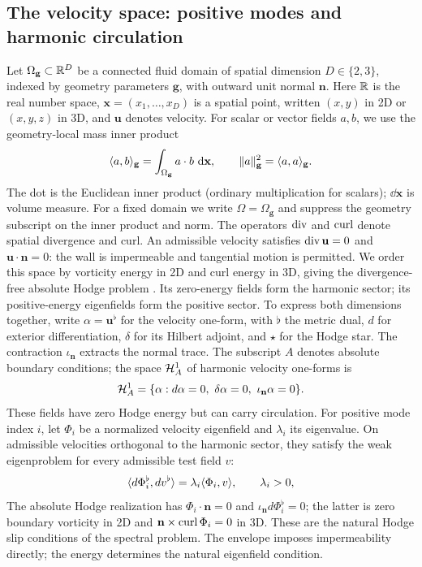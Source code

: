 \subsection{The velocity space: positive modes and harmonic circulation}
Let $\Omega_{\mathbf g}\subset\mathbb R^D$ be a connected fluid domain of spatial dimension $D\in\{2,3\}$, indexed by geometry parameters $\mathbf g$, with outward unit normal $\mathbf n$. Here $\mathbb R$ is the real number space, $\mathbf x=(x_1,\ldots,x_D)$ is a spatial point, written $(x,y)$ in 2D or $(x,y,z)$ in 3D, and $\mathbf u$ denotes velocity. For scalar or vector fields $a,b$, we use the geometry-local mass inner product
\begin{equation}
\langle a,b\rangle_{\mathbf g}=\int_{\Omega_{\mathbf g}}a\cdot b\,\,\mathrm d\mathbf x,
\qquad \lVert a\rVert_{\mathbf g}^2=\langle a,a\rangle_{\mathbf g}.
\label{eq:metric}
\end{equation}
The dot is the Euclidean inner product (ordinary multiplication for scalars); $\dd\mathbf x$ is volume measure. For a fixed domain we write $\Omega=\Omega_{\mathbf g}$ and suppress the geometry subscript on the inner product and norm. The operators $\operatorname{div}$ and $\operatorname{curl}$ denote spatial divergence and curl.
{An admissible velocity satisfies $\operatorname{div}\mathbf u=0$ and $\mathbf u\cdot\mathbf n=0$: the wall is impermeable and tangential motion is permitted.} We order this space by vorticity energy in 2D and curl energy in 3D, giving the divergence-free absolute Hodge problem {\citep{arnold2006finite}}. Its zero-energy fields form the harmonic sector; its positive-energy eigenfields form the positive sector. To express both dimensions together, write $\alpha=\mathbf u^\flat$ for the velocity one-form, with $\flat$ the metric dual, $d$ for exterior differentiation, $\delta$ for its Hilbert adjoint, and $\star$ for the Hodge star. The contraction $\iota_{\mathbf n}$ extracts the normal trace. The subscript $A$ denotes absolute boundary conditions; the space $\mathcal H_A^1$ of harmonic velocity one-forms is
\begin{equation}
\Harm_A^1=\{\alpha:d\alpha=0,\ \delta\alpha=0,\ \iota_{\mathbf n}\alpha=0\}.
\label{eq:harmonic-space}
\end{equation}
These fields have zero Hodge energy but can carry circulation. For positive mode index $i$, let $\Phi_i$ be a normalized velocity eigenfield and $\lambda_i$ its eigenvalue. On admissible velocities orthogonal to the harmonic sector, they satisfy the weak eigenproblem for every admissible test field $v$:
\begin{equation}
\langle d\Phi_i^\flat,d v^\flat\rangle=\lambda_i\langle \Phi_i,v\rangle,
\qquad \lambda_i>0,
\label{eq:target}
\end{equation}
\begingroup
The absolute Hodge realization has $\Phi_i\cdot\mathbf n=0$ and $\iota_{\mathbf n}d\Phi_i^\flat=0$; the latter is zero boundary vorticity in 2D and $\mathbf n\times\operatorname{curl}\Phi_i=0$ in 3D. These are the natural Hodge slip conditions of the spectral problem. The envelope imposes impermeability directly; the energy determines the natural eigenfield condition.
\par\endgroup

